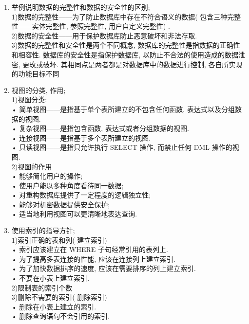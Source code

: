 \documentclass{article}                     %
\numberwithin{equation}{section}            %
\numberwithin{figure}{section}              %
\numberwithin{table}{section}               %
\begin{document}
\begin{enumerate}
\item 举例说明数据的完整性和数据的安全性的区别; \\
1)数据的完整性——为了防止数据库中存在不符合语义的数据( 包含三种完整性——实体完整性, 参照完整性, 用户自定义完整性) . \\
2)数据的安全性——用于保护数据库防止恶意破坏和非法存取. \\
3)数据的完整性和安全性是两个不同概念, 数据库的完整性是指数据的正确性和相容性. 数据库的安全性是指保护数据库, 以防止不合法的使用造成的数据泄密, 更玫或破坏. 其相同点是两者都是对数据库中的数据进行控制, 各自所实现的功能目标不同\\




\item 视图的分类, 作用; \\
1)视图分类: \\
• 简单视图——是指基于单个表所建立的不包含任何函数, 表达式以及分组数据的视图. \\
• 复杂视图——是指包含函数, 表达式或者分组数据的视图. \\
• 连接视图——是指基于多个表所建立的视图. \\
• 只读视图——是指只允许执行 SELECT 操作, 而禁止任何 DML 操作的视图. \\
2)视图的作用\\
• 能够简化用户的操作; \\
• 使用户能以多种角度看待同一数据; \\
• 对重构数据库提供了一定程度的逻辑独立性; \\
• 能够对机密数据提供安全保护; \\
• 适当地利用视图可以更清晰地表达查询. \\




\item 使用索引的指导方针; \\
1)索引正确的表和列( 建立索引) \\
• 索引应该建立在 WHERE 子句经常引用的表列上. \\
• 为了提高多表连接的性能, 应该在连接列上建立索引. \\
• 为了加快数据排序的速度, 应该在需要排序的列上建立索引. \\
• 不要在小表上建立索引. \\
2)限制表的索引个数\\
3)删除不需要的索引( 删除索引) \\
• 删除在小表上建立的索引. \\
• 删除查询语句不会引用的索引. \\







\end{enumerate}
\end{document}
